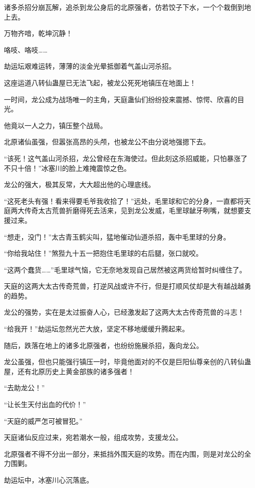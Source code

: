 \begin{this_body}
诸多杀招分崩瓦解，追杀到龙公身后的北原强者，仿若饺子下水，一个个栽倒到地上去。

万物齐喑，乾坤沉静！

咯吱、咯吱……

劫运坛艰难运转，薄薄的淡金光晕抵御着气盖山河杀招。

这座运道八转仙蛊屋已无法飞起，被龙公死死地镇压在地面上！

一时间，龙公成为战场唯一的主角，天庭蛊仙们纷纷投来震撼、惊愕、欣喜的目光。

他竟以一人之力，镇压整个战局。

北原诸仙虽强，但嚣张高昂的头颅，也被龙公不由分说地强摁下去。

“该死！这气盖山河杀招，龙公曾经在东海使过。但此刻这杀招威能，只怕暴涨了不只十倍！”冰塞川的脸上难掩震惊之色。

龙公的强大，极其反常，大大超出他的心理底线。

“这死老头有强！看来得要毛爷我收拾了！”远处，毛里球和它的分身，一直都将天庭两大传奇太古荒兽折磨得死去活来，见到龙公发威，毛里球龇牙咧嘴，就想要支援过来。

“想走，没门！”太古青玉鹤尖叫，猛地催动仙道杀招，轰中毛里球的分身。

“你给我站住！”煞狴九十五一把抱住毛里球的右后腿，张口就咬。

“这两个蠢货……”毛里球气恼，它无奈地发现自己居然被这两货给暂时纠缠住了。

天庭的这两大太古传奇荒兽，打逆风战或许不行，但是打顺风仗却是大有越战越勇的趋势。

龙公的强势，实在是太过振奋人心，已经激发起了这两大太古传奇荒兽的斗志！

“给我开！”劫运坛忽然光芒大放，坚定不移地缓缓升腾起来。

随后，跌落在地上的诸多北原强者，也纷纷施展杀招，轰向龙公。

龙公虽强，但也只能强行镇压一时，毕竟他面对的不仅是巨阳仙尊亲创的八转仙蛊屋，还有北原历史上黄金部族的诸多强者！

“去助龙公！”

“让长生天付出血的代价！”

“天庭的威严怎可被冒犯。”

天庭诸仙反应过来，宛若潮水一般，组成攻势，支援龙公。

北原强者不得不分出一部分，来抵挡外围天庭的攻势。而在内围，则是对龙公的全力围剿。

劫运坛中，冰塞川心沉落底。


\end{this_body}
